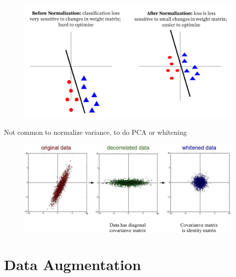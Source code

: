 \documentclass[serif, aspectratio=169]{beamer}
\begin{document}
\begin{frame}
	\begin{figure}[htpb]
		\begin{center}
			\includegraphics[keepaspectratio, scale=0.3]{pic/normaliz2}
		\end{center}
	\end{figure}	
\end{frame}


\begin{frame}{Not common to normalize variance, to do PCA or whitening}
	\begin{figure}[htpb]
		\begin{center}
			\includegraphics[keepaspectratio, scale=0.35]{pic/whiten}
		\end{center}
	\end{figure}	
\end{frame}

\section{Data Augmentation}
\end{document}
